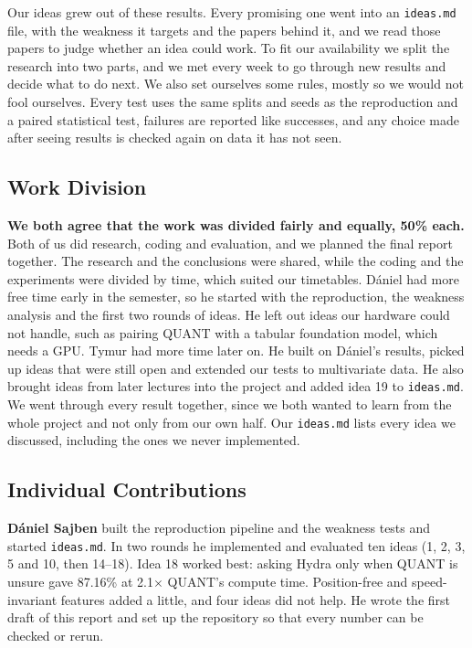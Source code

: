 \documentclass[conference]{IEEEtran}
\begin{document}
Our ideas grew out of these results. Every promising one went into an \texttt{ideas.md} file, with the weakness it targets and the papers behind it, and we read those papers to judge whether an idea could work. To fit our availability we split the research into two parts, and we met every week to go through new results and decide what to do next. We also set ourselves some rules, mostly so we would not fool ourselves. Every test uses the same splits and seeds as the reproduction and a paired statistical test, failures are reported like successes, and any choice made after seeing results is checked again on data it has not seen.

\subsection*{Work Division}
\textbf{We both agree that the work was divided fairly and equally, 50\% each.} Both of us did research, coding and evaluation, and we planned the final report together. The research and the conclusions were shared, while the coding and the experiments were divided by time, which suited our timetables. D\'aniel had more free time early in the semester, so he started with the reproduction, the weakness analysis and the first two rounds of ideas. He left out ideas our hardware could not handle, such as pairing QUANT with a tabular foundation model, which needs a GPU. Tymur had more time later on. He built on D\'aniel's results, picked up ideas that were still open and extended our tests to multivariate data. He also brought ideas from later lectures into the project and added idea 19 to \texttt{ideas.md}. We went through every result together, since we both wanted to learn from the whole project and not only from our own half. Our \texttt{ideas.md} lists every idea we discussed, including the ones we never implemented.

\subsection*{Individual Contributions}
\textbf{D\'aniel Sajben} built the reproduction pipeline and the weakness tests and started \texttt{ideas.md}. In two rounds he implemented and evaluated ten ideas (1, 2, 3, 5 and 10, then 14--18). Idea 18 worked best: asking Hydra only when QUANT is unsure gave 87.16\% at 2.1$\times$ QUANT's compute time. Position-free and speed-invariant features added a little, and four ideas did not help. He wrote the first draft of this report and set up the repository so that every number can be checked or rerun.
\end{document}
